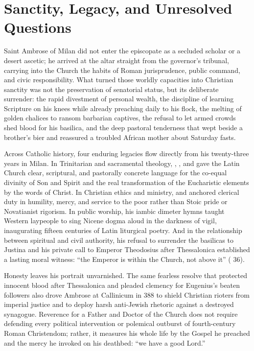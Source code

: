 \section{Sanctity, Legacy, and Unresolved Questions}

Saint Ambrose of Milan did not enter the episcopate as a secluded scholar or a desert ascetic; he arrived at the altar straight from the governor's tribunal, carrying into the Church the habits of Roman jurisprudence, public command, and civic responsibility. What turned those worldly capacities into Christian sanctity was not the preservation of senatorial status, but its deliberate surrender: the rapid divestment of personal wealth, the discipline of learning Scripture on his knees while already preaching daily to his flock, the melting of golden chalices to ransom barbarian captives, the refusal to let armed crowds shed blood for his basilica, and the deep pastoral tenderness that wept beside a brother's bier and reassured a troubled African mother about Saturday fasts.

Across Catholic history, four enduring legacies flow directly from his twenty-three years in Milan. In Trinitarian and sacramental theology, , , and  gave the Latin Church clear, scriptural, and pastorally concrete language for the co-equal divinity of Son and Spirit and the real transformation of the Eucharistic elements by the words of Christ. In Christian ethics and ministry,  and  anchored clerical duty in humility, mercy, and service to the poor rather than Stoic pride or Novatianist rigorism. In public worship, his iambic dimeter hymns taught Western laypeople to sing Nicene dogma aloud in the darkness of vigil, inaugurating fifteen centuries of Latin liturgical poetry. And in the relationship between spiritual and civil authority, his refusal to surrender the basilicas to Justina and his private call to Emperor Theodosius after Thessalonica established a lasting moral witness: ``the Emperor is within the Church, not above it'' ( 36).

Honesty leaves his portrait unvarnished. The same fearless resolve that protected innocent blood after Thessalonica and pleaded clemency for Eugenius's beaten followers also drove Ambrose at Callinicum in 388 to shield Christian rioters from imperial justice and to deploy harsh anti-Jewish rhetoric against a destroyed synagogue. Reverence for a Father and Doctor of the Church does not require defending every political intervention or polemical outburst of fourth-century Roman Christendom; rather, it measures his whole life by the Gospel he preached and the mercy he invoked on his deathbed: ``we have a good Lord.''

